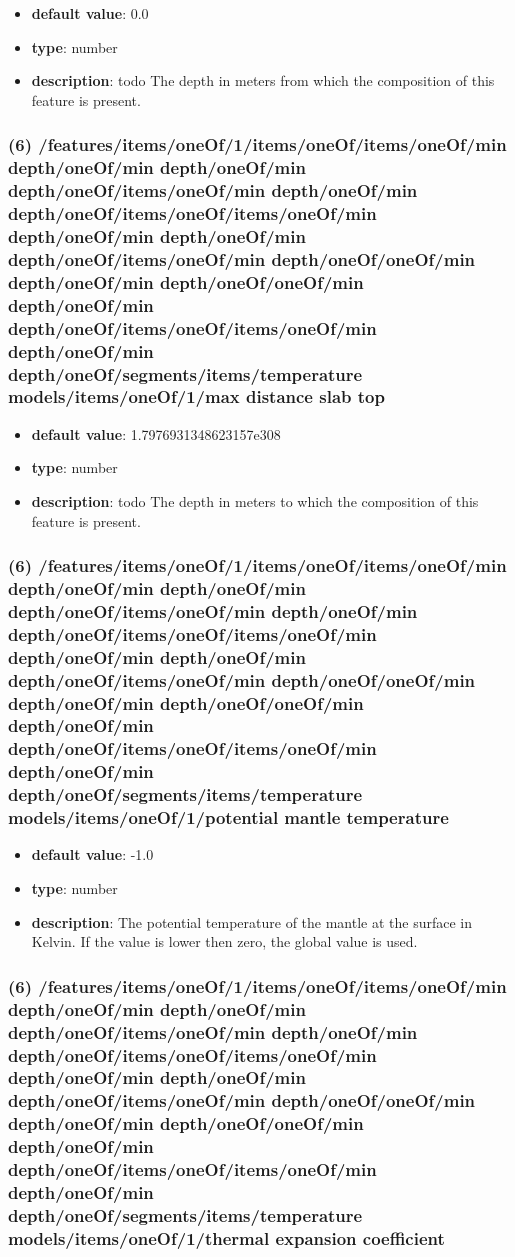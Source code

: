 \begin{itemize}[leftmargin=6em]\item {\bf default value}: 0.0
\item {\bf type}: number
\item {\bf description}: todo The depth in meters from which the composition of this feature is present.
\end{itemize}\subsubsection{(6) /features/items/oneOf/1/items/oneOf/items/oneOf/min depth/oneOf/min depth/oneOf/min depth/oneOf/items/oneOf/min depth/oneOf/min depth/oneOf/items/oneOf/items/oneOf/min depth/oneOf/min depth/oneOf/min depth/oneOf/items/oneOf/min depth/oneOf/oneOf/min depth/oneOf/min depth/oneOf/oneOf/min depth/oneOf/min depth/oneOf/items/oneOf/items/oneOf/min depth/oneOf/min depth/oneOf/segments/items/temperature models/items/oneOf/1/max distance slab top}
\begin{itemize}[leftmargin=6em]\item {\bf default value}: 1.7976931348623157e308
\item {\bf type}: number
\item {\bf description}: todo The depth in meters to which the composition of this feature is present.
\end{itemize}\subsubsection{(6) /features/items/oneOf/1/items/oneOf/items/oneOf/min depth/oneOf/min depth/oneOf/min depth/oneOf/items/oneOf/min depth/oneOf/min depth/oneOf/items/oneOf/items/oneOf/min depth/oneOf/min depth/oneOf/min depth/oneOf/items/oneOf/min depth/oneOf/oneOf/min depth/oneOf/min depth/oneOf/oneOf/min depth/oneOf/min depth/oneOf/items/oneOf/items/oneOf/min depth/oneOf/min depth/oneOf/segments/items/temperature models/items/oneOf/1/potential mantle temperature}
\begin{itemize}[leftmargin=6em]\item {\bf default value}: -1.0
\item {\bf type}: number
\item {\bf description}: The potential temperature of the mantle at the surface in Kelvin. If the value is lower then zero, the global value is used.
\end{itemize}\subsubsection{(6) /features/items/oneOf/1/items/oneOf/items/oneOf/min depth/oneOf/min depth/oneOf/min depth/oneOf/items/oneOf/min depth/oneOf/min depth/oneOf/items/oneOf/items/oneOf/min depth/oneOf/min depth/oneOf/min depth/oneOf/items/oneOf/min depth/oneOf/oneOf/min depth/oneOf/min depth/oneOf/oneOf/min depth/oneOf/min depth/oneOf/items/oneOf/items/oneOf/min depth/oneOf/min depth/oneOf/segments/items/temperature models/items/oneOf/1/thermal expansion coefficient}
